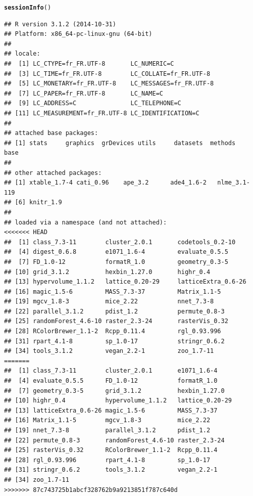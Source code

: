\documentclass[12pt]{article}\usepackage[]{graphicx}\usepackage[]{color}
\makeatletter
\newcommand{\hlstd}[1]{\textcolor[rgb]{0.345,0.345,0.345}{#1}}%
\newcommand{\hlkwd}[1]{\textcolor[rgb]{0.737,0.353,0.396}{\textbf{#1}}}%
\newenvironment{kframe}{%
 \def\at@end@of@kframe{}%
 \ifinner\ifhmode%
  \def\at@end@of@kframe{\end{minipage}}%
  \begin{minipage}{\columnwidth}%
 \fi\fi%
 \def\FrameCommand##1{\hskip\@totalleftmargin \hskip-\fboxsep
 \colorbox{shadecolor}{##1}\hskip-\fboxsep
     \hskip-\linewidth \hskip-\@totalleftmargin \hskip\columnwidth}%
 \MakeFramed {\advance\hsize-\width
   \@totalleftmargin\z@ \linewidth\hsize
   \@setminipage}}%
 {\par\unskip\endMakeFramed%
 \at@end@of@kframe}
\newenvironment{knitrout}{}{} %
\makeatother
\begin{document}
\begin{knitrout}\small
{}\color{fgcolor}\begin{kframe}
\begin{alltt}
\hlkwd{sessionInfo}\hlstd{()}
\end{alltt}
\begin{verbatim}
## R version 3.1.2 (2014-10-31)
## Platform: x86_64-pc-linux-gnu (64-bit)
## 
## locale:
##  [1] LC_CTYPE=fr_FR.UTF-8       LC_NUMERIC=C              
##  [3] LC_TIME=fr_FR.UTF-8        LC_COLLATE=fr_FR.UTF-8    
##  [5] LC_MONETARY=fr_FR.UTF-8    LC_MESSAGES=fr_FR.UTF-8   
##  [7] LC_PAPER=fr_FR.UTF-8       LC_NAME=C                 
##  [9] LC_ADDRESS=C               LC_TELEPHONE=C            
## [11] LC_MEASUREMENT=fr_FR.UTF-8 LC_IDENTIFICATION=C       
## 
## attached base packages:
## [1] stats     graphics  grDevices utils     datasets  methods   base     
## 
## other attached packages:
## [1] xtable_1.7-4 cati_0.96    ape_3.2      ade4_1.6-2   nlme_3.1-119
## [6] knitr_1.9   
## 
## loaded via a namespace (and not attached):
<<<<<<< HEAD
##  [1] class_7.3-11        cluster_2.0.1       codetools_0.2-10   
##  [4] digest_0.6.8        e1071_1.6-4         evaluate_0.5.5     
##  [7] FD_1.0-12           formatR_1.0         geometry_0.3-5     
## [10] grid_3.1.2          hexbin_1.27.0       highr_0.4          
## [13] hypervolume_1.1.2   lattice_0.20-29     latticeExtra_0.6-26
## [16] magic_1.5-6         MASS_7.3-37         Matrix_1.1-5       
## [19] mgcv_1.8-3          mice_2.22           nnet_7.3-8         
## [22] parallel_3.1.2      pdist_1.2           permute_0.8-3      
## [25] randomForest_4.6-10 raster_2.3-24       rasterVis_0.32     
## [28] RColorBrewer_1.1-2  Rcpp_0.11.4         rgl_0.93.996       
## [31] rpart_4.1-8         sp_1.0-17           stringr_0.6.2      
## [34] tools_3.1.2         vegan_2.2-1         zoo_1.7-11
=======
##  [1] class_7.3-11        cluster_2.0.1       e1071_1.6-4        
##  [4] evaluate_0.5.5      FD_1.0-12           formatR_1.0        
##  [7] geometry_0.3-5      grid_3.1.2          hexbin_1.27.0      
## [10] highr_0.4           hypervolume_1.1.2   lattice_0.20-29    
## [13] latticeExtra_0.6-26 magic_1.5-6         MASS_7.3-37        
## [16] Matrix_1.1-5        mgcv_1.8-3          mice_2.22          
## [19] nnet_7.3-8          parallel_3.1.2      pdist_1.2          
## [22] permute_0.8-3       randomForest_4.6-10 raster_2.3-24      
## [25] rasterVis_0.32      RColorBrewer_1.1-2  Rcpp_0.11.4        
## [28] rgl_0.93.996        rpart_4.1-8         sp_1.0-17          
## [31] stringr_0.6.2       tools_3.1.2         vegan_2.2-1        
## [34] zoo_1.7-11
>>>>>>> 87c743725b1abcf328762b9a9213851f787c640d
\end{verbatim}
\end{kframe}
\end{knitrout}
\end{document}
